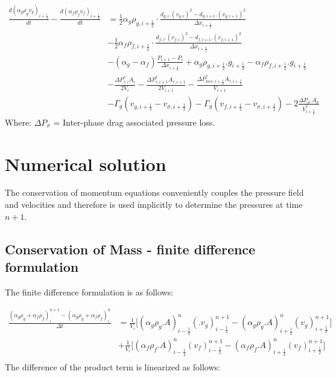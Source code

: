\documentclass[11pt,letterpaper,titlepage]{article}
\newcommand{\half}{\frac{1}{2}}
\begin{document}
\begin{equation}
\begin{aligned}
\frac{d(\alpha_g\rho_g v_g)_{i+\half}}{dt}-\frac{d(\alpha_f\rho_f v_f)_{i+\half}}{dt}
&=\half \alpha_g \rho_{g,i+\half} \cdot\frac{d_{g,i}.(v_{g,i})^2-d_{g,i+1}.(v_{g,i+1})^2}{\Delta x_{i+\half}} \\
&-\half \alpha_f \rho_{f,i+\half} \cdot\frac{d_{f,i}.(v_{f,i})^2-d_{f,i+1}.(v_{f,i+1})^2}{\Delta x_{i+\half}} \\
&-(\alpha_g-\alpha_f)\frac{P_{i+1}-P_i}{\Delta x_{i+\half}} + \alpha_g \rho_{g,i+\half}.g_{i+\half} - \alpha_f\rho_{f,i+\half}.g_{i+\half}\\
&-\frac{\Delta P_{\tau,i}^*A_i}{2V_i}-\frac{\Delta P_{\tau,i+1}^*A_{\tau,i+1}}{2V_{i+1}} 
-\frac{\Delta P_{loss,i+\half}^*A_{\tau,i+\half}}{V_{i+1}}\\
& - \Gamma_g (v_{g,i+\half} - v_{\sigma,i+\half})- \Gamma_g (v_{f,i+\half} - v_{\sigma,i+\half})-2\frac{\Delta P_{\sigma}.A_{\sigma}}{V_{i+\half}^*}
\end{aligned}
\end{equation}
\noindent 
Where: 
\newline \noindent $\Delta P_{\sigma}$ \quad = Inter-phase drag associated pressure loss.












\newpage
{}
\section{Numerical solution}
The conservation of momentum equations conveniently couples the pressure field and velocities and therefore is used implicitly to determine the pressures at time $n+1$.





\vspace{0.5cm}
\subsection{Conservation of Mass - finite difference formulation}
The finite difference formulation is as follows:


\begin{equation*}
\begin{aligned}
 \frac{(\alpha_g \rho_g+\alpha_f\rho_f)_{i}^{n+1}-(\alpha_g \rho_g+\alpha_f\rho_f)_{i}^{n}}{\Delta t} 
&= \frac{1}{V_i}\biggr[(\alpha_g\rho_g.A)_{i-\half}^{n} (.v_g)_{i-\half}^{n+1}
-(\alpha_g\rho_g.A)_{i+\half}^{n} (v_g)_{i+\half}^{n+1} \biggr]\\
&+ \frac{1}{V_i}\biggr[(\alpha_f\rho_f.A)_{i-\half}^{n} (v_f)_{i-\half}^{n+1}
-(\alpha_f\rho_f.A)_{i+\half}^{n} (v_f)_{i+\half}^{n+1} \biggr]\\
\end{aligned}
\end{equation*}
\noindent The difference of the product term is linearized as follows:
\end{document}

